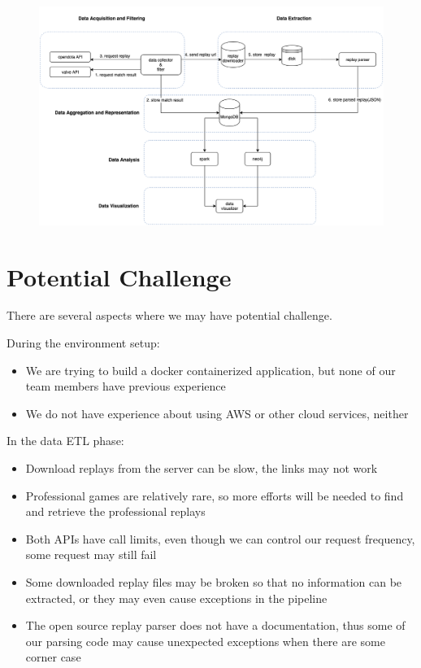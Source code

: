 \documentclass{article}
\begin{document}
\begin{figure}[H]
	\centering
	\includegraphics[width=\linewidth]{pic/arc.png}
\end{figure}

\section{Potential Challenge}

There are several aspects where we may have potential challenge.

During the environment setup:

\begin{itemize}
	\item We are trying to build a docker containerized application, but none of our team members have previous experience
	\item We do not have experience about using AWS or other cloud services, neither
\end{itemize}

In the data ETL phase:

\begin{itemize}
	\item Download replays from the server can be slow, the links may not work
	\item Professional games are relatively rare, so more efforts will be needed to find and retrieve the professional replays
	\item Both APIs have call limits, even though we can control our request frequency, some request may still fail
	\item Some downloaded replay files may be broken so that no information can be extracted, or they may even cause exceptions in the pipeline
	\item The open source replay parser does not have a documentation, thus some of our parsing code may cause unexpected exceptions when there are some corner case
\end{itemize}
\end{document}
